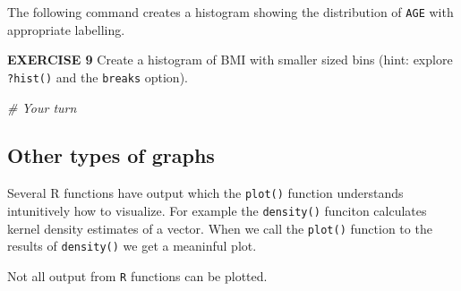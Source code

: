 \documentclass[
]{article}
\newenvironment{Shaded}{\begin{snugshade}}{\end{snugshade}}
\newcommand{\CommentTok}[1]{\textcolor[rgb]{0.56,0.35,0.01}{\textit{#1}}}
\newcommand{\DataTypeTok}[1]{\textcolor[rgb]{0.13,0.29,0.53}{#1}}
\newcommand{\KeywordTok}[1]{\textcolor[rgb]{0.13,0.29,0.53}{\textbf{#1}}}
\newcommand{\NormalTok}[1]{#1}
\newcommand{\OperatorTok}[1]{\textcolor[rgb]{0.81,0.36,0.00}{\textbf{#1}}}
\newcommand{\StringTok}[1]{\textcolor[rgb]{0.31,0.60,0.02}{#1}}
\begin{document}
The following command creates a histogram showing the distribution of
\texttt{AGE} with appropriate labelling.

\begin{Shaded}
\end{Shaded}

\textbf{EXERCISE 9} Create a histogram of BMI with smaller sized bins
(hint: explore \texttt{?hist()} and the \texttt{breaks} option).

\begin{Shaded}
\begin{Highlighting}[]
\CommentTok{# Your turn}
\end{Highlighting}
\end{Shaded}

\hypertarget{other-types-of-graphs}{%
\subsection{Other types of graphs}\label{other-types-of-graphs}}

Several R functions have output which the \texttt{plot()} function
understands intunitively how to visualize. For example the
\texttt{density()} funciton calculates kernel density estimates of a
vector. When we call the \texttt{plot()} function to the results of
\texttt{density()} we get a meaninful plot.

Not all output from \texttt{R} functions can be plotted.

\begin{Shaded}
\end{Shaded}
\end{document}

